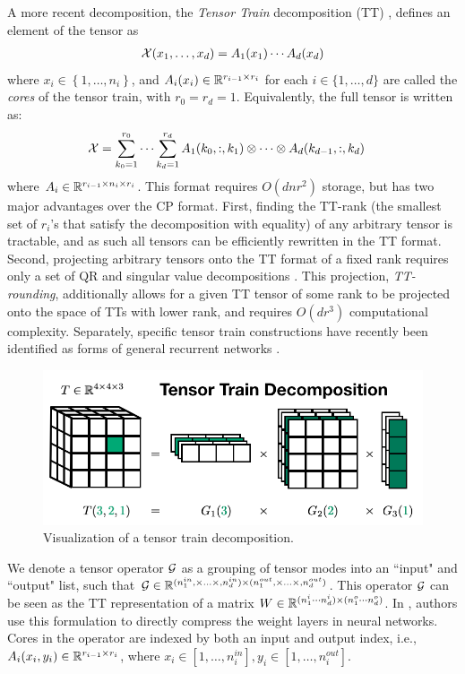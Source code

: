 A more recent decomposition, the \textit{Tensor Train} decomposition (TT) \cite{oseledets2011tensor}, defines an element of the tensor as
\begin{align}
\mathcal{X}(x_1,\ldots,x_d) = A_1(x_1)\cdots A_d(x_d)
\end{align}
where $x_i \in \left\{1,\ldots, n_i\right\}$, and $A_i(x_i) \in \mathbb{R}^{r_{i-1} \times r_{i}}$ for each $i \in \{1,\ldots,d\}$ are called the \textit{cores} of the tensor train, with $r_0 = r_d = 1$. Equivalently, the full tensor is written as:
\begin{align}\label{eq:fullTT}
	\mathcal{X} &= \sum_{k_0 = 1}^{r_0} \cdots \sum_{k_d = 1}^{r_d} A_1(k_0,:,k_1) \otimes \cdots \otimes A_d(k_{d-1},:,k_d) 
\end{align}
where $A_i \in \mathbb{R}^{r_{i-1}\times n_i \times r_i} $. 
This format requires $O(dnr^2)$ storage, but has two major advantages over the CP format. First, finding the TT-rank (the smallest set of $r_i$'s that satisfy the decomposition with equality) of any arbitrary tensor is tractable, and as such all tensors can be efficiently rewritten in the TT format. Second, projecting arbitrary tensors onto the TT format of a fixed rank requires only a set of QR and singular value decompositions \citep{oseledets2011tensor}. This projection, \textit{TT-rounding}, additionally allows for a given TT tensor of some rank to be projected onto the space of TTs with lower rank, and requires $O(dr^3)$ computational complexity. Separately, specific tensor train constructions have recently been identified as forms of general recurrent networks \citep{khrulkov2018generalized}.
\begin{figure}
	\includegraphics[width=\textwidth]{2_bknd/tt_decomp.png}
	\caption[Tensor train decomposition]{\label{fig:ttdecomp} Visualization of a tensor train decomposition.}
\end{figure}
We denote a tensor operator $\mathcal{G}$ as a grouping of tensor modes into an ``input" and ``output" list, such that $\mathcal{G} \in \mathbb{R}^{(n_1^{in},\times\ldots\times,n_d^{in}) \times (n_1^{out},\times\ldots\times,n_d^{out})}$. This operator $\mathcal{G}$ can be seen as the TT representation of a matrix $W \in \mathbb{R}^{(n_1^i\cdots n_d^i) \times (n_1^o\cdots n_d^o)}$. In \cite{novikov2015tensorizing}, authors use this formulation to directly compress the weight layers in neural networks. Cores in the operator are indexed by both an input and output index, i.e., $A_i(x_i,y_i) \in \mathbb{R}^{r_{i-1}\times r_i}$, where $x_i \in [1,\ldots,n_i^{in}], y_i \in [1,\ldots,n_i^{out}]$.


